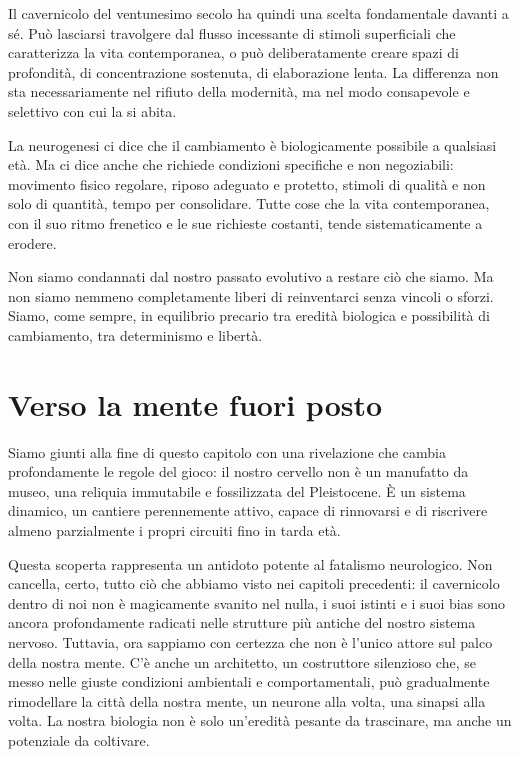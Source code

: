 Il cavernicolo del ventunesimo secolo ha quindi una scelta fondamentale davanti a sé. Può lasciarsi travolgere dal flusso incessante di stimoli superficiali che caratterizza la vita contemporanea, o può deliberatamente creare spazi di profondità, di concentrazione sostenuta, di elaborazione lenta. La differenza non sta necessariamente nel rifiuto della modernità, ma nel modo consapevole e selettivo con cui la si abita.

La neurogenesi ci dice che il cambiamento è biologicamente possibile a qualsiasi età. Ma ci dice anche che richiede condizioni specifiche e non negoziabili: movimento fisico regolare, riposo adeguato e protetto, stimoli di qualità e non solo di quantità, tempo per consolidare. Tutte cose che la vita contemporanea, con il suo ritmo frenetico e le sue richieste costanti, tende sistematicamente a erodere.

Non siamo condannati dal nostro passato evolutivo a restare ciò che siamo. Ma non siamo nemmeno completamente liberi di reinventarci senza vincoli o sforzi. Siamo, come sempre, in equilibrio precario tra eredità biologica e possibilità di cambiamento, tra determinismo e libertà.

\section{Verso la mente fuori posto}

Siamo giunti alla fine di questo capitolo con una rivelazione che cambia profondamente le regole del gioco: il nostro cervello non è un manufatto da museo, una reliquia immutabile e fossilizzata del Pleistocene. È un sistema dinamico, un cantiere perennemente attivo, capace di rinnovarsi e di riscrivere almeno parzialmente i propri circuiti fino in tarda età.

Questa scoperta rappresenta un antidoto potente al fatalismo neurologico. Non cancella, certo, tutto ciò che abbiamo visto nei capitoli precedenti: il cavernicolo dentro di noi non è magicamente svanito nel nulla, i suoi istinti e i suoi bias sono ancora profondamente radicati nelle strutture più antiche del nostro sistema nervoso. Tuttavia, ora sappiamo con certezza che non è l'unico attore sul palco della nostra mente. C'è anche un architetto, un costruttore silenzioso che, se messo nelle giuste condizioni ambientali e comportamentali, può gradualmente rimodellare la città della nostra mente, un neurone alla volta, una sinapsi alla volta. La nostra biologia non è solo un'eredità pesante da trascinare, ma anche un potenziale da coltivare.

